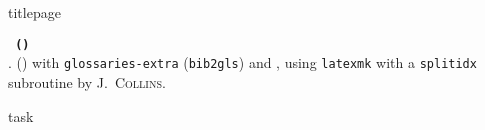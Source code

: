 %
{titlepage}%
\cleardoubleevenpage%
\vspace*{\fill}
\DeclareUrlCommand{}%
{%
\thispagestyle{empty}
\begin{minipage}{0.5\linewidth}
\label{metadata}
\color{g2}
\footnotesize
\raggedright
\noindent\texttt{\bfseries\jobname{}
\expandafter\EscWrapper\expandafter{\GitVersion}
(\expandafter\EscWrapper\expandafter{\GitShorthash})}\\[\baselineskip]

\noindent\prettybanner{}.
\hologo{\fmtname} (\fmtversion) with \texttt{glossaries-extra} (\texttt{bib2gls}) and , using \texttt{latexmk} with a \texttt{splitidx} subroutine by J.\ \textsc{Collins}.
\end{minipage}
}%
\cleardoubleoddpage%
{task}%
\cleardoubleoddpage
\vspace*{\fill}
%
%
